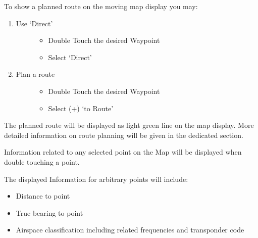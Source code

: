 \documentclass[letterpaper,10pt,english]{sphinxmanual}
\begin{document}
To show a planned route on the moving map display you may:
\begin{enumerate}
%
\item {} \begin{description}
\item[{Use ‘Direct’}] \leavevmode\begin{itemize}
\item {} 
Double Touch the desired Waypoint

\item {} 
Select ‘Direct’

\end{itemize}

\end{description}

\item {} \begin{description}
\item[{Plan a route}] \leavevmode\begin{itemize}
\item {} 
Double Touch the desired Waypoint

\item {} 
Select (+) ‘to Route’

\end{itemize}

\end{description}

\end{enumerate}

The planned route will be displayed as light green line on the map display. More detailed information on route planning will be given in the dedicated section.


Information related to any selected point on the Map will be displayed when double touching a point.

The displayed Information for arbitrary points will include:
\begin{itemize}
\item {} 
Distance to point

\item {} 
True bearing to point

\item {} 
Airspace classification including related frequencies and transponder code

\end{itemize}
\end{document}
